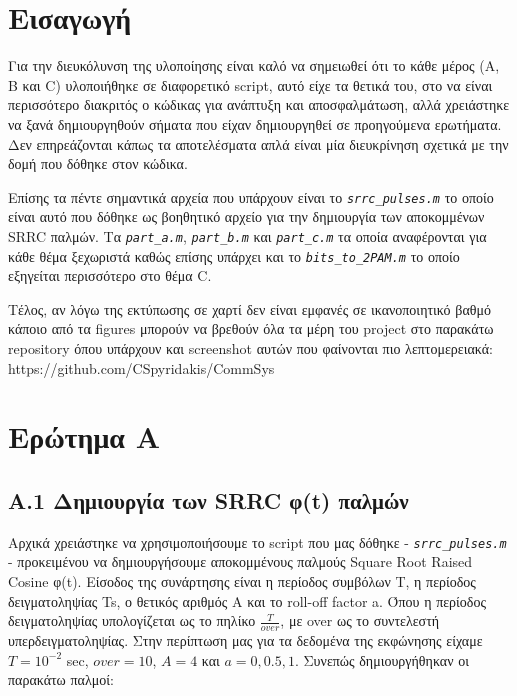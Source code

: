 \documentclass[11pt]{article}
\begin{document}
    \section{Εισαγωγή}
    Για την διευκόλυνση της υλοποίησης είναι καλό να σημειωθεί ότι το κάθε μέρος (Α, Β και C) υλοποιήθηκε σε διαφορετικό script, αυτό είχε τα θετικά του, στο να είναι περισσότερο διακριτός ο κώδικας για ανάπτυξη και αποσφαλμάτωση, αλλά χρειάστηκε να ξανά δημιουργηθούν σήματα που είχαν δημιουργηθεί σε προηγούμενα ερωτήματα. Δεν επηρεάζονται κάπως τα αποτελέσματα απλά είναι μία διευκρίνηση σχετικά με την δομή που δόθηκε στον κώδικα. 
    \par \noindent
    Επίσης τα πέντε σημαντικά αρχεία που υπάρχουν είναι το \emph{\texttt{srrc\_pulses.m}} το οποίο είναι αυτό που δόθηκε ως βοηθητικό αρχείο για την δημιουργία των αποκομμένων SRRC παλμών. Τα \emph{\texttt{part\_a.m}}, \emph{\texttt{part\_b.m}} και \emph{\texttt{part\_c.m}} τα οποία αναφέρονται για κάθε θέμα ξεχωριστά καθώς επίσης υπάρχει και το \emph{\texttt{bits\_to\_2PAM.m}} το οποίο εξηγείται περισσότερο στο θέμα C.
    \par \noindent
    Τέλος, αν λόγω της εκτύπωσης σε χαρτί δεν είναι εμφανές σε ικανοποιητικό βαθμό κάποιο από τα figures μπορούν να βρεθούν όλα τα μέρη του project στο παρακάτω repository όπου υπάρχουν και screenshot αυτών που φαίνονται πιο λεπτομερειακά: https://github.com/CSpyridakis/CommSys



    \section{Ερώτημα Α}
    
    \subsection*{Α.1 Δημιουργία των SRRC φ(t) παλμών}
    Αρχικά χρειάστηκε να χρησιμοποιήσουμε το script που μας δόθηκε - \emph{\texttt{srrc\_pulses.m}} - προκειμένου να δημιουργήσουμε αποκομμένους παλμούς Square Root Raised Cosine φ(t). Είσοδος της συνάρτησης είναι η περίοδος συμβόλων T, η περίοδος δειγματοληψίας Ts, ο θετικός αριθμός Α και το roll-off factor a. Όπου η περίοδος δειγματοληψίας υπολογίζεται ως το πηλίκο $\frac{T}{over}$, με over ως το συντελεστή υπερδειγματοληψίας. Στην περίπτωση μας για τα δεδομένα της εκφώνησης είχαμε $T = {10^{−2}}$ sec, $over = 10$, $A = 4$ και $a = 0, 0.5, 1$. Συνεπώς  δημιουργήθηκαν οι παρακάτω παλμοί:
\end{document}
